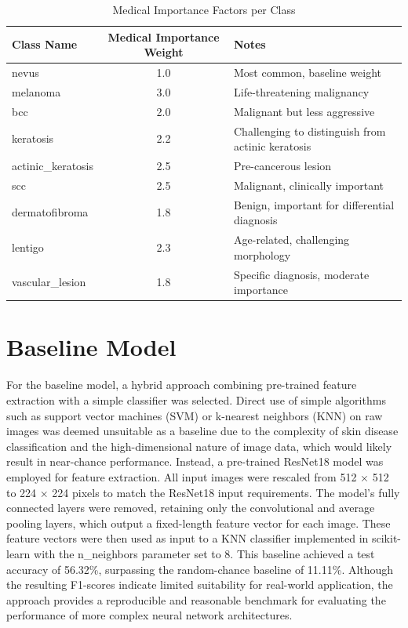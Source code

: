 \documentclass{article} %
\begin{document}
\begin{table}[H]
\caption{Medical Importance Factors per Class}
\label{medical-importance}
\begin{center}
\footnotesize
\begin{tabularx}{\textwidth}{|l|c|X|}
\hline
\textbf{Class Name} & \textbf{Medical Importance Weight} & \textbf{Notes} \\
\hline
nevus & 1.0 & Most common, baseline weight \\
\hline
melanoma & 3.0 & Life-threatening malignancy \\
\hline
bcc & 2.0 & Malignant but less aggressive \\
\hline
keratosis & 2.2 & Challenging to distinguish from actinic keratosis \\
\hline
actinic\_keratosis & 2.5 & Pre-cancerous lesion \\
\hline
scc & 2.5 & Malignant, clinically important \\
\hline
dermatofibroma & 1.8 & Benign, important for differential diagnosis \\
\hline
lentigo & 2.3 & Age-related, challenging morphology \\
\hline
vascular\_lesion & 1.8 & Specific diagnosis, moderate importance \\
\hline
\end{tabularx}
\end{center}
\end{table}

\section{Baseline Model}

For the baseline model, a hybrid approach combining pre-trained feature extraction with a simple classifier was selected. Direct use of simple algorithms such as support vector machines (SVM) or k-nearest neighbors (KNN) on raw images was deemed unsuitable as a baseline due to the complexity of skin disease classification and the high-dimensional nature of image data, which would likely result in near-chance performance. Instead, a pre-trained ResNet18 model was employed for feature extraction. All input images were rescaled from 512 × 512 to 224 × 224 pixels to match the ResNet18 input requirements. The model's fully connected layers were removed, retaining only the convolutional and average pooling layers, which output a fixed-length feature vector for each image. These feature vectors were then used as input to a KNN classifier implemented in scikit-learn with the n\_neighbors parameter set to 8. This baseline achieved a test accuracy of 56.32\%, surpassing the random-chance baseline of 11.11\%. Although the resulting F1-scores indicate limited suitability for real-world application, the approach provides a reproducible and reasonable benchmark for evaluating the performance of more complex neural network architectures.
\end{document}
